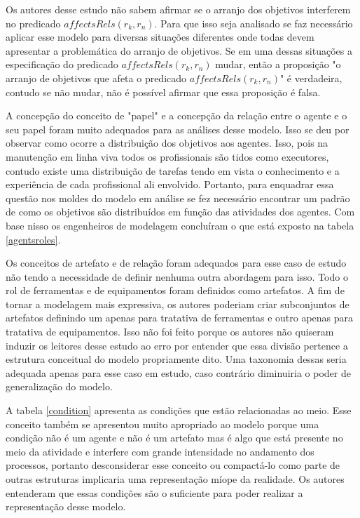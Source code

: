 Os autores desse estudo não sabem afirmar se o arranjo dos objetivos interferem no predicado $affectsRels(r_k,r_n)$. Para que isso seja analisado se faz necessário aplicar esse modelo para diversas situações diferentes onde todas devem apresentar a problemática do arranjo de objetivos. Se em uma dessas situações a especificação do predicado $affectsRels(r_k,r_n)$ mudar, então a proposição "o arranjo de objetivos que afeta o predicado $affectsRels(r_k,r_n)$" é verdadeira, contudo se não mudar, não é possível afirmar que essa proposição é falsa. 

A concepção do conceito de "papel" e a concepção da relação entre o agente e o seu papel foram muito adequados para as análises desse modelo. Isso se deu por observar como ocorre a distribuição dos objetivos aos agentes. Isso, pois na manutenção em linha viva todos os profissionais são tidos como executores, contudo existe uma distribuição de tarefas tendo em vista o conhecimento e a experiência de cada profissional ali envolvido. Portanto, para enquadrar essa questão nos moldes do modelo em análise se fez necessário encontrar um padrão de como os objetivos são distribuídos em função das atividades dos agentes. Com base nisso os engenheiros de modelagem concluíram o que está exposto na tabela \ref{agentsroles}.

Os conceitos de artefato e de relação foram adequados para esse caso de estudo não tendo a necessidade de definir nenhuma outra abordagem para isso. Todo o rol de ferramentas e de equipamentos foram definidos como artefatos. A fim de tornar a modelagem mais expressiva, os autores poderiam criar subconjuntos de artefatos definindo um apenas para tratativa de ferramentas e outro apenas para tratativa de equipamentos. Isso não foi feito porque os autores não quiseram induzir os leitores desse estudo ao erro por entender que essa divisão pertence a estrutura conceitual do modelo propriamente dito. Uma taxonomia dessas seria adequada apenas para esse caso em estudo, caso contrário diminuiria o poder de generalização do modelo. 

A tabela \ref{condition} apresenta as condições que estão relacionadas ao meio. Esse conceito também se apresentou muito apropriado ao modelo porque uma condição não é um agente e não é um artefato mas é algo que está presente no meio da atividade e interfere com grande intensidade no andamento dos processos, portanto desconsiderar esse conceito ou compactá-lo como parte de outras estruturas implicaria uma representação míope da realidade. Os autores entenderam que essas condições são o suficiente para poder realizar a representação desse modelo.

